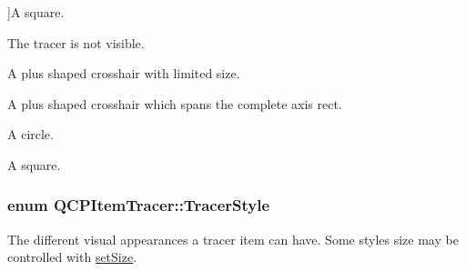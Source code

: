 \begin{Desc}
\begin{description}
{}]A square. \item[{\em 
ts\+None\hypertarget{class_q_c_p_item_tracer_a2f05ddb13978036f902ca3ab47076500af543193a0b17ac133beb26152292f6b6}{}\label{class_q_c_p_item_tracer_a2f05ddb13978036f902ca3ab47076500af543193a0b17ac133beb26152292f6b6}
}]The tracer is not visible. \item[{\em 
ts\+Plus\hypertarget{class_q_c_p_item_tracer_a2f05ddb13978036f902ca3ab47076500ac9a231fd2a98eb04f4e0d102c9656514}{}\label{class_q_c_p_item_tracer_a2f05ddb13978036f902ca3ab47076500ac9a231fd2a98eb04f4e0d102c9656514}
}]A plus shaped crosshair with limited size. \item[{\em 
ts\+Crosshair\hypertarget{class_q_c_p_item_tracer_a2f05ddb13978036f902ca3ab47076500afe1146977c53e62390e0d01cbc9b0d05}{}\label{class_q_c_p_item_tracer_a2f05ddb13978036f902ca3ab47076500afe1146977c53e62390e0d01cbc9b0d05}
}]A plus shaped crosshair which spans the complete axis rect. \item[{\em 
ts\+Circle\hypertarget{class_q_c_p_item_tracer_a2f05ddb13978036f902ca3ab47076500a73fb6b1df0d29b66d59a3607402ac5b6}{}\label{class_q_c_p_item_tracer_a2f05ddb13978036f902ca3ab47076500a73fb6b1df0d29b66d59a3607402ac5b6}
}]A circle. \item[{\em 
ts\+Square\hypertarget{class_q_c_p_item_tracer_a2f05ddb13978036f902ca3ab47076500adf458a753354dc478e2d896a0260edcc}{}\label{class_q_c_p_item_tracer_a2f05ddb13978036f902ca3ab47076500adf458a753354dc478e2d896a0260edcc}
}]A square. \end{description}
\end{Desc}
\subsubsection[{\texorpdfstring{Tracer\+Style}{TracerStyle}}]{\setlength{\rightskip}{0pt plus 5cm}enum {\bf Q\+C\+P\+Item\+Tracer\+::\+Tracer\+Style}}\hypertarget{class_q_c_p_item_tracer_a2f05ddb13978036f902ca3ab47076500}{}\label{class_q_c_p_item_tracer_a2f05ddb13978036f902ca3ab47076500}
The different visual appearances a tracer item can have. Some styles size may be controlled with \hyperlink{class_q_c_p_item_tracer_ae47fe0617f5fef5fdb766999569be10a}{set\+Size}.

